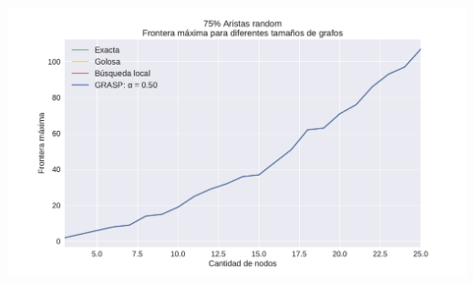 {\centering
    \includegraphics[width=1\textwidth]{informe/imgs/exp_random75_frontera_todos_v2.pdf}
}
